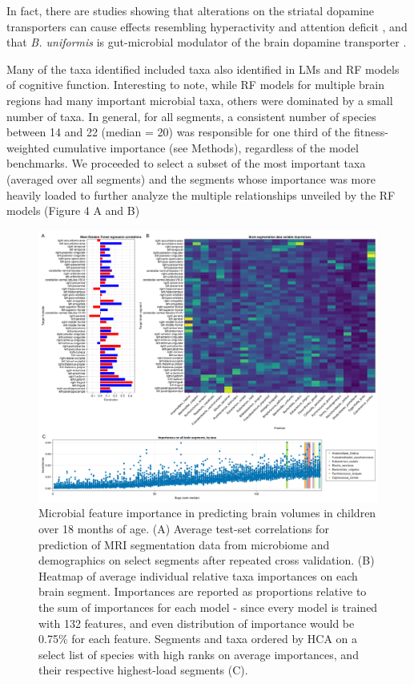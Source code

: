 \documentclass[a4paper]{article}
\begin{document}
In fact, there are studies showing that alterations on the striatal
dopamine transporters can cause effects resembling hyperactivity and
attention deficit
\citep{yaelDisinhibitionNucleusAccumbens2019},
and that \emph{B. uniformis} is gut-microbial modulator of the brain
dopamine transporter
\citep{hartstraInfusionDonorFeces2020}.


Many of the taxa identified included taxa also identified in LMs and RF
models of cognitive function. Interesting to note, while RF models for
multiple brain regions had many important microbial taxa, others were
dominated by a small number of taxa. In general, for all segments, a
consistent number of species between 14 and 22 (median = 20) was
responsible for one third of the fitness-weighted cumulative importance
(see Methods), regardless of the model benchmarks. We proceeded to
select a subset of the most important taxa (averaged over all segments)
and the segments whose importance was more heavily loaded to further
analyze the multiple relationships unveiled by the RF models
(Figure 4 A and B)

\begin{figure}
    \centering
    \includegraphics[width=\textwidth]{assets/Figure4.png}
    \caption{
        Microbial feature importance in predicting brain volumes in children over 18 months of age.
        (A) Average test-set correlations for prediction of MRI segmentation
        data from microbiome and demographics on select segments after repeated
        cross validation. (B) Heatmap of average individual relative taxa
        importances on each brain segment. Importances are reported as
        proportions relative to the sum of importances for each model - since
        every model is trained with 132 features, and even distribution of
        importance would be 0.75\% for each feature. Segments and taxa ordered
        by HCA on a select list of species with high ranks on average importances,
        and their respective highest-load segments (C).
    }
    \label{fig:Figure 4}
\end{figure}
\end{document}
